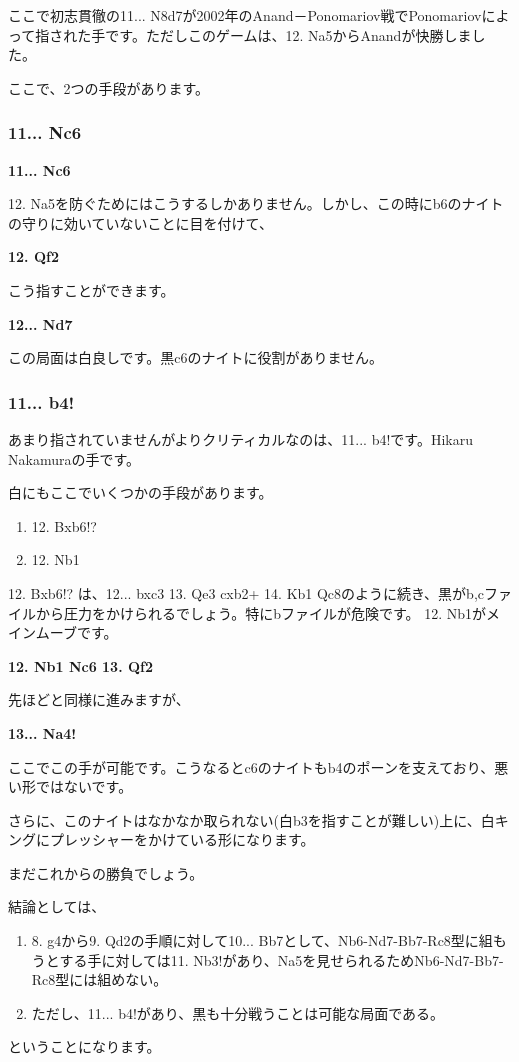 ここで初志貫徹の11... N8d7が2002年のAnand－Ponomariov戦でPonomariovによって指された手です。ただしこのゲームは、12. Na5からAnandが快勝しました。

ここで、2つの手段があります。

\subsubsection{ 11... Nc6}

{\bf 11... Nc6}

12. Na5を防ぐためにはこうするしかありません。しかし、この時にb6のナイトの守りに効いていないことに目を付けて、

{\bf 12. Qf2}

こう指すことができます。

{\bf 12... Nd7}

この局面は白良しです。黒c6のナイトに役割がありません。

\subsubsection{11... b4!}

あまり指されていませんがよりクリティカルなのは、11... b4!です。Hikaru Nakamuraの手です。

白にもここでいくつかの手段があります。
\begin{enumerate}
\item 12. Bxb6!?
\item 12. Nb1
\end{enumerate}

12. Bxb6!? は、12... bxc3 13. Qe3 cxb2+ 14. Kb1 Qc8のように続き、黒がb,cファイルから圧力をかけられるでしょう。特にbファイルが危険です。
12. Nb1がメインムーブです。

{\bf 12. Nb1 Nc6 13. Qf2}

先ほどと同様に進みますが、

{\bf 13... Na4!}

ここでこの手が可能です。こうなるとc6のナイトもb4のポーンを支えており、悪い形ではないです。

さらに、このナイトはなかなか取られない(白b3を指すことが難しい)上に、白キングにプレッシャーをかけている形になります。

まだこれからの勝負でしょう。

結論としては、
\begin{enumerate}
\item 8. g4から9. Qd2の手順に対して10... Bb7として、Nb6-Nd7-Bb7-Rc8型に組もうとする手に対しては11. Nb3!があり、Na5を見せられるためNb6-Nd7-Bb7-Rc8型には組めない。
\item ただし、11... b4!があり、黒も十分戦うことは可能な局面である。
\end{enumerate}
ということになります。


